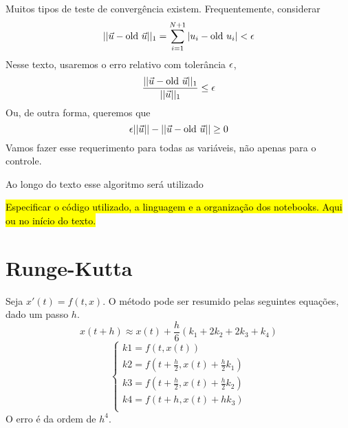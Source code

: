 Muitos tipos de teste de convergência existem. Frequentemente, considerar 
$$
||\vec{u} - \text{old }\vec{u}||_1 = \sum_{i=1}^{N+1} |u_i - \text{old }u_i| < \epsilon   
$$
Nesse texto, usaremos o erro relativo com tolerância $\epsilon$,
$$
\frac{||\vec{u} - \text{old }\vec{u}||_1}{||\vec{u}||_1} \le \epsilon 
$$
Ou, de outra forma, queremos que 
$$
\epsilon ||\vec{u}|| - ||\vec{u} - \text{old }\vec{u}|| \ge 0
$$
Vamos fazer esse requerimento para todas as variáveis, não apenas para o
controle. 

Ao longo do texto esse algoritmo será utilizado 

\hl{Especificar o c\'odigo utilizado, a linguagem e a organiza\c{c}\~ao dos
notebooks. Aqui ou no in\'icio do texto.}

\section{Runge-Kutta}

Seja $x'(t) = f(t,x)$. O método pode ser resumido pelas seguintes equações, dado um passo $h$. 
\begin{equation*}
    x(t + h) \approx x(t) + \frac{h}{6}(k_1 + 2k_2 + 2k_3 + k_4) 
\end{equation*}
\begin{equation*}
    \begin{cases}
    k1 = f(t,x(t)) \\
    k2 = f(t + \frac{h}{2},x(t) + \frac{h}{2}k_1) \\
    k3 = f(t + \frac{h}{2},x(t) + \frac{h}{2}k_2) \\
    k4 = f(t + h, x(t) + hk_3) \\
    \end{cases}
\end{equation*}
O erro é da ordem de $h^4$. 